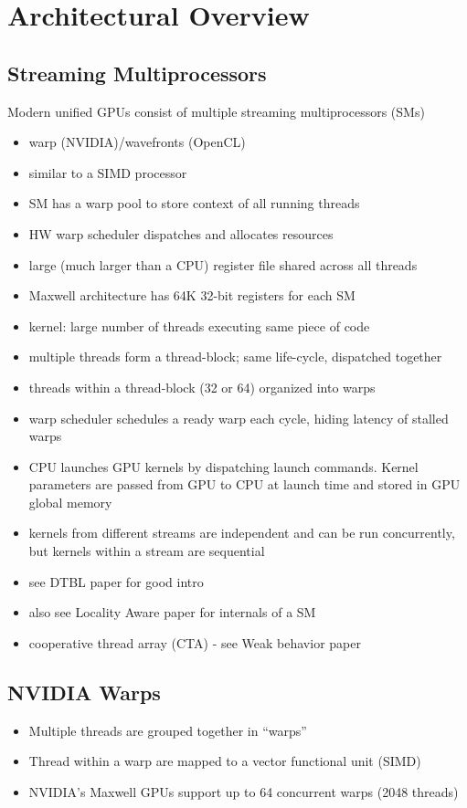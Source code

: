 \documentclass[prodmode,acmtecs]{acmsmall} %
\begin{document}
\section{Architectural Overview} \label{sec:architecture}
\subsection{Streaming Multiprocessors}
Modern unified GPUs consist of multiple streaming multiprocessors (SMs)
\begin{itemize}
  \item warp (NVIDIA)/wavefronts (OpenCL)
  \item similar to a SIMD processor
  \item SM has a warp pool to store context of all running threads
  \item HW warp scheduler dispatches and allocates resources
  \item large (much larger than a CPU) register file shared across all threads
    \item Maxwell architecture has 64K 32-bit registers for each SM
  \item kernel: large number of threads executing same piece of code
  \item multiple threads form a thread-block; same life-cycle, dispatched together
  \item threads within a thread-block (32 or 64) organized into warps
  \item warp scheduler schedules a ready warp each cycle, hiding latency of stalled warps
  \item CPU launches GPU kernels by dispatching launch commands. Kernel parameters are passed from GPU to CPU at launch time and stored in GPU global memory
  \item kernels from different streams are independent and can be run concurrently, but kernels within a stream are sequential
  \item see DTBL paper for good intro
  \item also see Locality Aware paper for internals of a SM
  \item cooperative thread array (CTA) - see Weak behavior paper
\end{itemize}
\subsection{NVIDIA Warps}
\begin{itemize}
  \item Multiple threads are grouped together in ``warps''
  \item Thread within a warp are mapped to a vector functional unit (SIMD)
  \item NVIDIA's Maxwell GPUs support up to 64 concurrent warps (2048 threads)
\end{itemize}
\end{document}

